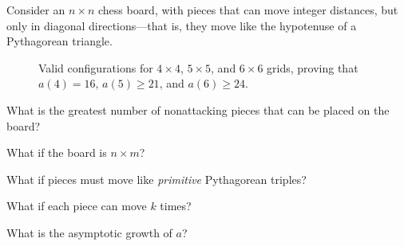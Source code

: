 \documentclass{article}
\begin{document}
  Consider an $n \times n$ chess board, with pieces that can move integer
  distances, but only in diagonal directions---that is, they move like the
  hypotenuse of a Pythagorean triangle.
\begin{figure}[!h]
  \centering
   \hspace{1cm}
   \hspace{1cm}
   \hspace{1cm}
  \caption{
    Valid configurations for $4 \times 4$, $5 \times 5$, and $6 \times 6$ grids,
    proving that $a(4) = 16$, $a(5) \geq 21$, and $a(6) \geq 24$.}
\end{figure}

\begin{question}
  What is the greatest number of nonattacking pieces that can be placed on the board?
\end{question}

\begin{related}
  \item What if the board is $n \times m$?
  \item What if pieces must move like \textit{primitive} Pythagorean triples?
  \item What if each piece can move $k$ times?
  \item What is the asymptotic growth of $a$?
\end{related}
\end{document}
